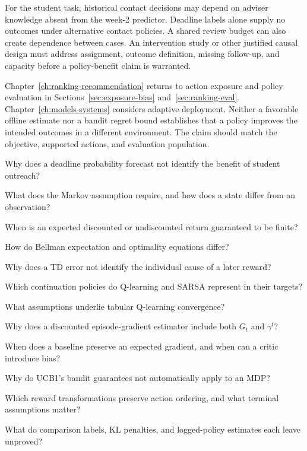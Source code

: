 For the student task, historical contact decisions may depend on adviser knowledge absent from the week-2 predictor. Deadline labels alone supply no outcomes under alternative contact policies. A shared review budget can also create dependence between cases. An intervention study or other justified causal design must address assignment, outcome definition, missing follow-up, and capacity before a policy-benefit claim is warranted.

Chapter~\ref{ch:ranking-recommendation} returns to action exposure and policy evaluation in Sections~\ref{sec:exposure-bias} and~\ref{sec:ranking-eval}. Chapter~\ref{ch:models-systems} considers adaptive deployment. Neither a favorable offline estimate nor a bandit regret bound establishes that a policy improves the intended outcomes in a different environment. The claim should match the objective, supported actions, and evaluation population.

\begin{studyquestions}
\item Why does a deadline probability forecast not identify the benefit of student outreach?
\item What does the Markov assumption require, and how does a state differ from an observation?
\item When is an expected discounted or undiscounted return guaranteed to be finite?
\item How do Bellman expectation and optimality equations differ?
\item Why does a TD error not identify the individual cause of a later reward?
\item Which continuation policies do Q-learning and SARSA represent in their targets?
\item What assumptions underlie tabular Q-learning convergence?
\item Why does a discounted episode-gradient estimator include both $G_t$ and $\gamma^t$?
\item When does a baseline preserve an expected gradient, and when can a critic introduce bias?
\item Why do UCB1's bandit guarantees not automatically apply to an MDP?
\item Which reward transformations preserve action ordering, and what terminal assumptions matter?
\item What do comparison labels, KL penalties, and logged-policy estimates each leave unproved?
\end{studyquestions}

